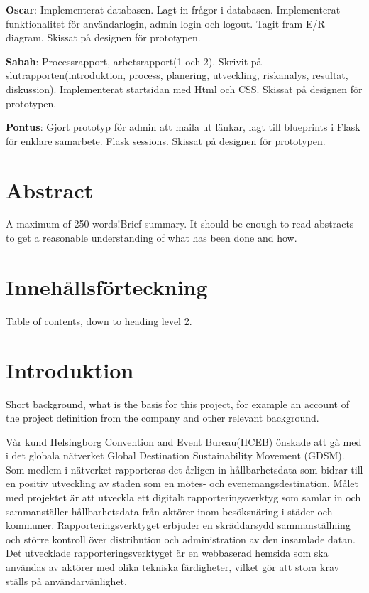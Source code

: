 \documentclass[12pt]{article}
\begin{document}
\textbf{Oscar}: Implementerat databasen. Lagt in frågor i databasen. Implementerat funktionalitet för användarlogin, admin login och logout. Tagit fram E/R diagram. Skissat på designen för prototypen.

\textbf{Sabah}: Processrapport, arbetsrapport(1 och 2). Skrivit på slutrapporten(introduktion, process, planering, utveckling, riskanalys, resultat, diskussion). Implementerat startsidan med Html och CSS. Skissat på designen för prototypen.  

\textbf{Pontus}: Gjort prototyp för admin att maila ut länkar, lagt till blueprints i Flask för enklare samarbete. Flask sessions. Skissat på designen för prototypen.


\section{Abstract}
A maximum of 250 words!Brief summary. It should be enough to read abstracts to get a reasonable understanding of what has been done and how.

\section{Innehållsförteckning}
Table of contents, down to heading level 2.

\section{Introduktion}
Short background, what is the basis for this project, for example an account of the project definition from the company and other relevant background.

Vår kund Helsingborg Convention and Event Bureau(HCEB) önskade att gå med i det globala nätverket Global Destination Sustainability Movement (GDSM). Som medlem i nätverket rapporteras det årligen in hållbarhetsdata som bidrar till en positiv utveckling av staden som en mötes- och evenemangsdestination. Målet med projektet är att utveckla ett digitalt rapporteringsverktyg som samlar in och sammanställer hållbarhetsdata från aktörer inom besöksnäring i städer och kommuner. Rapporteringsverktyget erbjuder en skräddarsydd sammanställning och större kontroll över distribution och administration av den insamlade datan. Det utvecklade rapporteringsverktyget är en webbaserad hemsida som ska användas av aktörer med olika tekniska färdigheter, vilket gör att stora krav ställs på användarvänlighet.
\end{document}
